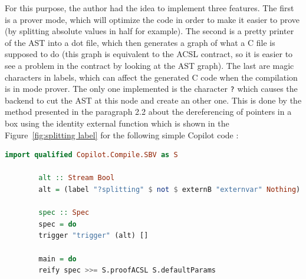 \documentclass[a4paper,11pt,final]{article}
\begin{document}
	For this purpose, the author had the idea to implement three features. The first is a prover mode, which will optimize the code in order to make it easier to prove (by splitting absolute values in half for example). The second is a pretty printer of the AST into a dot file, which then generates a graph of what a C file is supposed to do (this graph is equivalent to the ACSL contract, so it is easier to see a problem in the contract by looking at the AST graph). The last are magic characters in labels, which can affect the generated C code when the compilation is in mode prover. The only one implemented is the character \texttt{?} which causes the backend to cut the AST at this node and create an other one. This is done by the method presented in the paragraph 2.2 about the dereferencing of pointers in a box using the identity external function which is shown in the Figure~\ref{fig:splitting label} for the following simple Copilot code :
	\begin{lstlisting}[language=Haskell]
		import qualified Copilot.Compile.SBV as S
		
		alt :: Stream Bool
		alt = (label "?splitting" $ not $ externB "externvar" Nothing)
		
		spec :: Spec
		spec = do
		trigger "trigger" (alt) []
		
		main = do
		reify spec >>= S.proofACSL S.defaultParams
	\end{lstlisting}
\end{document}
